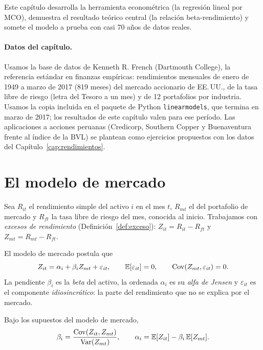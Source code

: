 Este capítulo desarrolla la herramienta econométrica (la regresión lineal por MCO), demuestra el
resultado teórico central (la relación beta-rendimiento) y somete el modelo a prueba con casi 70 años de
datos reales.

\paragraph{Datos del capítulo.} Usamos la base de datos de Kenneth R. French (Dartmouth College), la
referencia estándar en finanzas empíricas: rendimientos mensuales de enero de 1949 a marzo de 2017 (819
meses) del mercado accionario de EE.\,UU., de la tasa libre de riesgo (letra del Tesoro a un mes) y de
12 portafolios por industria. Usamos la copia incluida en el paquete de Python \texttt{linearmodels}, que
termina en marzo de 2017; los resultados de este capítulo valen para ese período. Las aplicaciones a
acciones peruanas (Credicorp, Southern Copper y Buenaventura frente al índice de la BVL) se plantean como
ejercicios propuestos con los datos del Capítulo~\ref{cap:rendimientos}.

\section{El modelo de mercado}

Sea $R_{it}$ el rendimiento simple del activo $i$ en el mes $t$, $R_{mt}$ el del portafolio de mercado y
$R_{ft}$ la tasa libre de riesgo del mes, conocida al inicio. Trabajamos con \emph{excesos de rendimiento}
(Definición~\ref{def:exceso}): $Z_{it}=R_{it}-R_{ft}$ y $Z_{mt}=R_{mt}-R_{ft}$.

\begin{definicion}
El modelo de mercado postula que
\[
  Z_{it}=\alpha_i+\beta_i Z_{mt}+\varepsilon_{it},\qquad \mathbb{E}[\varepsilon_{it}]=0,\qquad
  \operatorname{Cov}(Z_{mt},\varepsilon_{it})=0 .
\]
La pendiente $\beta_i$ es la \emph{beta} del activo, la ordenada $\alpha_i$ es su \emph{alfa de Jensen}
y $\varepsilon_{it}$ es el componente \emph{idiosincrático}: la parte del rendimiento que no se explica por
el mercado.
\end{definicion}

\begin{proposicion}\label{prop:betapob}
Bajo los supuestos del modelo de mercado,
\[
  \beta_i=\frac{\operatorname{Cov}(Z_{it},Z_{mt})}{\operatorname{Var}(Z_{mt})},\qquad \alpha_i=\mathbb{E}[Z_{it}]-\beta_i\,\mathbb{E}[Z_{mt}] .
\]
\end{proposicion}

